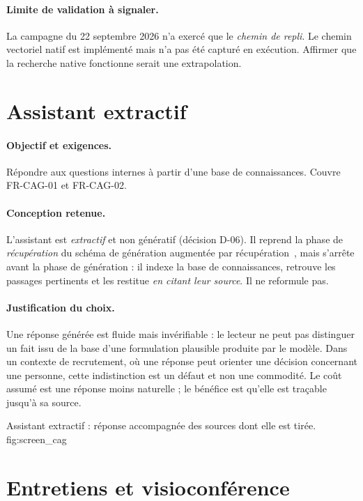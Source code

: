\paragraph{Limite de validation à signaler.} La campagne du 22 septembre 2026
n'a exercé que le \emph{chemin de repli}. Le chemin vectoriel natif est
implémenté mais n'a pas été capturé en exécution. Affirmer que la recherche
native fonctionne serait une extrapolation.

\section{Assistant extractif}
\label{sec:impl_cag}

\paragraph{Objectif et exigences.} Répondre aux questions internes à partir
d'une base de connaissances. Couvre FR-CAG-01 et FR-CAG-02.

\paragraph{Conception retenue.} L'assistant est \emph{extractif} et non
génératif (décision D-06). Il reprend la phase de \emph{récupération} du
schéma de génération augmentée par récupération~\cite{lewis2020rag}, mais
s'arrête avant la phase de génération : il indexe la base de connaissances,
retrouve les passages pertinents et les restitue \emph{en citant leur
source}. Il ne reformule pas.

\paragraph{Justification du choix.} Une réponse générée est fluide mais
invérifiable : le lecteur ne peut pas distinguer un fait issu de la base d'une
formulation plausible produite par le modèle. Dans un contexte de recrutement,
où une réponse peut orienter une décision concernant une personne, cette
indistinction est un défaut et non une commodité. Le coût assumé est une
réponse moins naturelle ; le bénéfice est qu'elle est traçable jusqu'à sa
source.

  {Assistant extractif : réponse accompagnée des sources dont elle est tirée.}
  {fig:screen_cag}

\section{Entretiens et visioconférence}
\label{sec:impl_interviews}


